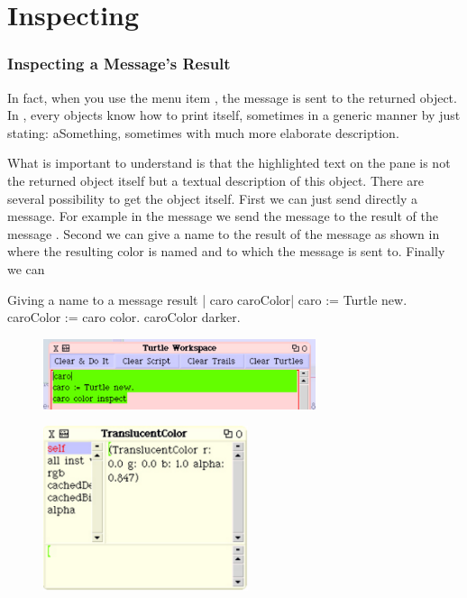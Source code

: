 \ifx\wholebook\relax\else



\fi

\chapter{Inspecting}\label{ch:turtleTeaching}


\subsection*{Inspecting  a Message's Result}

In fact, when you use the menu item , the message  is sent to the returned object. In \sq, every objects  know how to print itself, sometimes in a generic manner by just stating: aSomething, sometimes with much more elaborate description.

What is important to understand is that the highlighted text on the pane is not the returned object itself but a textual description of this object. There are several possibility to get the object itself. First we can just send directly a message. For example in the message   we send the message  to the result of the message . Second we can give a name to  the result of the message as shown in  where the resulting color is named  and to which the message  is sent to. Finally we can 

\begin{scriptwithtitle}{Giving a name to a message result}\label{scr:naming}
| caro caroColor|
caro := Turtle new.
caroColor := caro color.
caroColor darker.
\end{scriptwithtitle}

\begin{figure}
\centerline{\includegraphics[width=8cm]{inspect}} 
\caption{\label{fig:inspect}}
\end{figure}


\begin{figure}
\centerline{\includegraphics[width=6cm]{inspectedColor}} 
\caption{\label{fig:inspectedColor}}
\end{figure}




\ifx\wholebook\relax\else\fi
